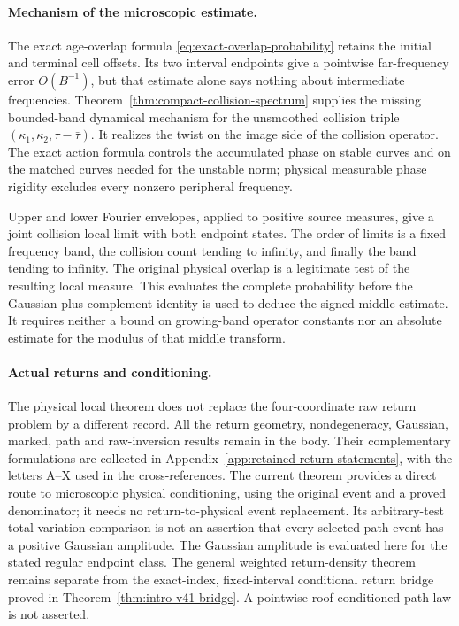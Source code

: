 \documentclass[11pt,reqno]{amsart}
\numberwithin{equation}{section}
\theoremstyle{definition}\newtheorem{definition}[theorem]{Definition}
\theoremstyle{remark}\newtheorem{remark}[theorem]{Remark}
\begin{document}
\paragraph{Mechanism of the microscopic estimate.}
The exact age-overlap formula
\eqref{eq:exact-overlap-probability} retains the initial and terminal
cell offsets. Its two interval endpoints give a pointwise far-frequency
error $O(B^{-1})$, but that estimate alone says nothing about intermediate
frequencies. Theorem~\ref{thm:compact-collision-spectrum} supplies the
missing bounded-band dynamical mechanism for the unsmoothed collision
triple $(\kappa_1,\kappa_2,\tau-\bar\tau)$. It realizes the twist on
the image side of the collision operator. The exact action formula
controls the accumulated phase on stable curves and on the matched
curves needed for the unstable norm; physical measurable phase rigidity
excludes every nonzero peripheral frequency.

Upper and lower Fourier envelopes, applied to positive source measures,
give a joint collision local limit with both endpoint states. The order of limits is a fixed
frequency band, the collision count tending to infinity, and finally
the band tending to infinity. The original physical overlap is a
legitimate test of the resulting local measure. This evaluates the
complete probability before the Gaussian-plus-complement identity is
used to deduce the signed middle estimate. It requires neither a bound
on growing-band operator constants nor an absolute estimate for the
modulus of that middle transform.

\paragraph{Actual returns and conditioning.}
The physical local theorem does not replace the four-coordinate raw
return problem by a different record. All the return geometry,
nondegeneracy, Gaussian, marked, path and raw-inversion results remain
in the body. Their complementary formulations are collected in
Appendix~\ref{app:retained-return-statements}, with the letters A--X
used in the cross-references. The current theorem provides a direct
route to microscopic physical conditioning, using the original event
and a proved denominator; it needs no return-to-physical event
replacement. Its arbitrary-test total-variation comparison is not an
assertion that every selected path event has a positive Gaussian
amplitude. The Gaussian amplitude is evaluated here for the stated
regular endpoint class. The general weighted return-density theorem
remains separate from the exact-index, fixed-interval conditional
return bridge proved in Theorem~\ref{thm:intro-v41-bridge}. A pointwise
roof-conditioned path law is not asserted.
\end{document}
